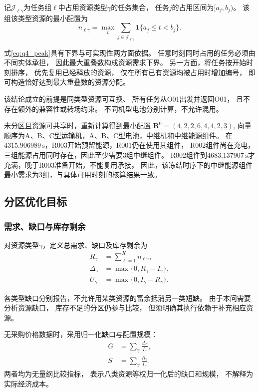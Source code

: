 \documentclass[bwprint]{gmcmthesis}
\begin{document}
记$\mathcal{J}_{\ell\gamma}$为任务组$\ell$中占用资源类型$\gamma$的任务集合，
任务$j$的占用区间为$[a_j,b_j)$。
该组该类型资源的最小配置为
\begin{equation}
n_{\ell\gamma}
=
\max_t
\sum_{j\in\mathcal{J}_{\ell\gamma}}
\mathbf{1}\{a_j\leq t<b_j\}.
\label{eq:q4_peak}
\end{equation}

式\eqref{eq:q4_peak}具有下界与可实现性两方面依据。
任意时刻同时占用的任务必须由不同实体承担，
因此最大重叠数构成资源需求下界。
另一方面，将任务按开始时刻排序，
优先复用已经释放的资源，
仅在所有已有资源均被占用时增加编号，
即可构造恰好达到最大重叠数的资源分配。

该结论成立的前提是同类型资源可互换、
所有任务从O01出发并返回O01，
且不存在额外的兼容性或转场约束。
不同机型电池分别计算，不允许混用。

未分区且资源可共享时，重新计算得到最小配置
\(\boldsymbol R^0=(4,2,2,6,4,4,2,3)\),
向量顺序为A、B、C型运输机，A、B、C型电池，中继机和中继能源组件。
在$4315.906989\,\mathrm{s}$，R003开始预留能源，R001仍在使用其组件，
R002组件尚在充电，三组能源占用同时存在，因此至少需要3组中继组件。
R002组件到$4683.137907\,\mathrm{s}$才充满，晚于R003准备开始，不能复用承接。
因此，该冻结时序下的中继能源组件最小需求为3组，与具体可用时刻的核算结果一致。

\subsection{分区优化目标}

\subsubsection{需求、缺口与库存剩余}

对资源类型$\gamma$，定义总需求、缺口及库存剩余为
\begin{align}
R_\gamma&=\sum_{\ell=1}^{K}n_{\ell\gamma},\\
\Delta_\gamma&=\max\{0,R_\gamma-I_\gamma\},\\
U_\gamma&=\max\{0,I_\gamma-R_\gamma\}.
\end{align}

各类型缺口分别报告，不允许用某类资源的富余抵消另一类短缺。
由于本问需要分析资源缺口，
库存不足的分区仍参与比较，
但须明确其执行依赖于补充相应资源。

无采购价格数据时，采用归一化缺口与配置规模：
\begin{align}
G&=\sum_{\gamma}\frac{\Delta_\gamma}{I_\gamma},\\
S&=\sum_{\gamma}\frac{R_\gamma}{I_\gamma}.
\end{align}
两者均为无量纲比较指标，
表示八类资源等权归一化后的缺口和规模，
不解释为实际经济成本。
\end{document}

